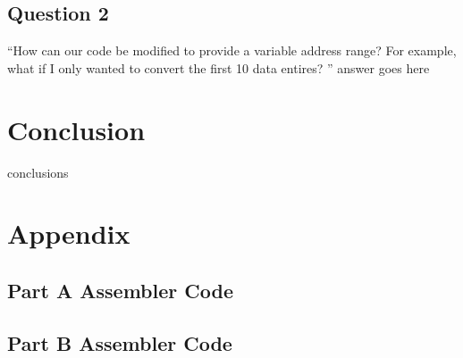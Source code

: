 \documentclass[letterpaper]{article}
\begin{document}
    \subsection{Question 2}
      \item ``How can our code be modified to provide a variable address range? For example, what if I only wanted to convert the first 10 data entires? ''
      answer goes here


\section{Conclusion}
  conclusions

\section{Appendix}
  \subsection{Part A Assembler Code}

    

  \subsection{Part B Assembler Code}

    
\end{document}
